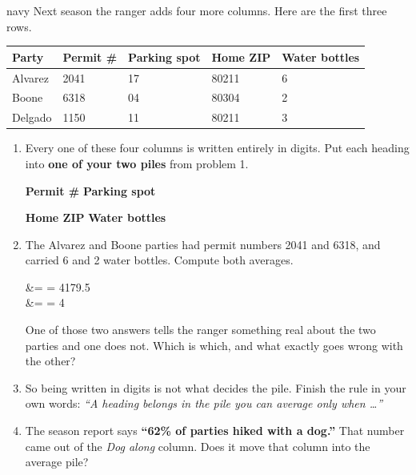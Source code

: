 \boxguard[16]
\begin{scenariobox}{navy}
Next season the ranger adds four more columns. Here are the first three rows.

\vspace{4pt}
\small
\renewcommand{\arraystretch}{1.12}
\begin{tabularx}{\linewidth}{@{} l Y Y Y Y @{}}
\textbf{Party} & \textbf{Permit \#} & \textbf{Parking spot} & \textbf{Home ZIP} &
\textbf{Water bottles} \\
\hline
Alvarez & 2041 & 17 & 80211 & 6 \\
Boone   & 6318 & 04 & 80304 & 2 \\
Delgado & 1150 & 11 & 80211 & 3 \\
\hline
\end{tabularx}

\normalsize
\begin{enumerate}[label=\textbf{\alph*.}, leftmargin=1.8em, itemsep=6pt]
  \item Every one of these four columns is written entirely in digits. Put each heading into
        \textbf{one of your two piles} from problem 1.

        \vspace{2pt}

        \textbf{Permit \#} \blank{2.6cm} \hfill \textbf{Parking spot} \blank{2.6cm}

        \vspace{4pt}
        \textbf{Home ZIP} \blank{2.6cm} \hfill \textbf{Water bottles} \blank{2.6cm}
  \item The Alvarez and Boone parties had permit numbers 2041 and 6318, and carried 6 and 2
        water bottles. Compute both averages.
        \begin{work}
         &=  = 4179.5 \\[4pt]
         &=  = 4
        \end{work}
        One of those two answers tells the ranger something real about the two parties and one
        does not. Which is which, and what exactly goes wrong with the other?
        \answerspace{1.8cm}{}
  \item So being written in digits is not what decides the pile. Finish the rule in your own
        words: \emph{``A heading belongs in the pile you can average only when \ldots{}''}
        \answerspace{1.6cm}{}
  \item The season report says \textbf{``62\% of parties hiked with a dog.''} That number came
        out of the \emph{Dog along} column. Does it move that column into the average pile?
        \answerspace{2.0cm}{}
\end{enumerate}
\end{scenariobox}

